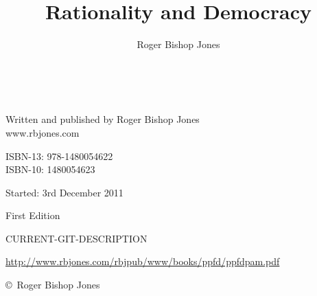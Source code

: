 \documentclass[10pt,a4paper.titlepage,openany,twocolumn]{book}
\author{Roger Bishop Jones}
\title{Rationality and Democracy}
\begin{document}
\frontmatter

\begin{titlepage}
\maketitle

\vfill

\begin{centering}

\

\vfill
Written and published by Roger Bishop Jones\\
www.rbjones.com\\
\vspace{0.2in}

ISBN-13: 978-1480054622\\
ISBN-10: 1480054623

{\footnotesize

Started: 3rd December 2011

First Edition

\vspace{0.2in}

\tiny{CURRENT-GIT-DESCRIPTION}

\vspace{0.2in}


\href{http://www.rbjones.com/rbjpub/www/books/ppfd/ppfdpam.pdf}
{http://www.rbjones.com/rbjpub/www/books/ppfd/ppfdpam.pdf}


\copyright\ Roger Bishop Jones

}%

\end{centering}

\thispagestyle{empty}
\end{titlepage}

\onecolumn

{\parskip=0pt\tableofcontents}

\vfill

\pagebreak

\twocolumn
\end{document}
